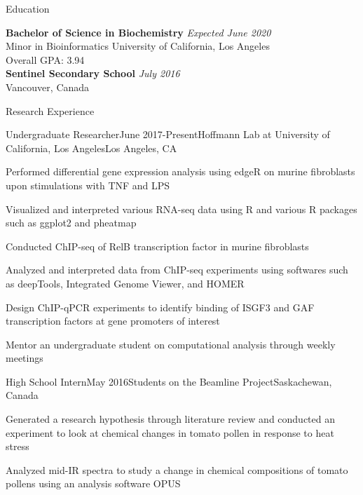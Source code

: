 \documentclass{resume} %
\begin{document}

\begin{rSection}{Education}

{\bf Bachelor of Science in Biochemistry } \hfill {\em Expected June 2020} \\ 
Minor in Bioinformatics \hfill  University of California, Los Angeles  \smallskip \\
Overall GPA: 3.94 \\[0.3cm]
{\bf Sentinel Secondary School} \hfill {\em July 2016} \\ 
Vancouver, Canada 
\end{rSection}


\begin{rSection}{Research Experience}

\begin{rSubsection}{Undergraduate Researcher}{June 2017-Present}{Hoffmann Lab at University of California, Los Angeles}{Los Angeles, CA}
\item Performed differential gene expression analysis using edgeR on murine fibroblasts upon stimulations with TNF and LPS
\item Visualized and interpreted various RNA-seq data using R and various R packages such as ggplot2 and pheatmap
\item Conducted ChIP-seq of RelB transcription factor in murine fibroblasts 
\item Analyzed and interpreted data from ChIP-seq experiments using softwares such as deepTools, Integrated Genome Viewer, and HOMER
\item Design ChIP-qPCR experiments to identify binding of ISGF3 and GAF transcription factors at gene promoters of interest
\item Mentor an undergraduate student on computational analysis through weekly meetings
\end{rSubsection}



\begin{rSubsection}{High School Intern}{May 2016}{Students on the Beamline Project}{Saskachewan, Canada}
\item Generated a research hypothesis through literature review and conducted an experiment to look at chemical changes in tomato pollen in response to heat stress
\item Analyzed mid-IR spectra to study a change in chemical compositions of tomato pollens using an analysis software OPUS
\end{rSubsection}\end{rSection}
\end{document}
